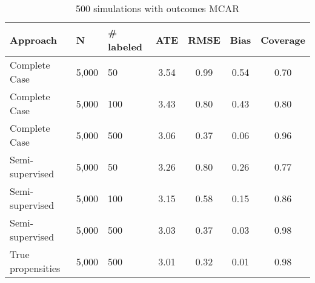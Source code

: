 \begin{table}[ht]
\centering
\begingroup\small
\begin{tabular}{lllcccc}
  \hline
Approach & N & \# labeled & ATE & RMSE & Bias & Coverage \\ 
  \hline
  Complete Case & 5,000 &  50 & 3.54 & 0.99 & 0.54 & 0.70 \\ 
  Complete Case & 5,000 & 100 & 3.43 & 0.80 & 0.43 & 0.80 \\ 
Complete Case & 5,000 & 500 & 3.06 & 0.37 & 0.06 & 0.96 \\ 
  Semi-supervised & 5,000 &  50 & 3.26 & 0.80 & 0.26 & 0.77 \\ 
  Semi-supervised & 5,000 & 100 & 3.15 & 0.58 & 0.15 & 0.86 \\ 
  Semi-supervised & 5,000 & 500 & 3.03 & 0.37 & 0.03 & 0.98 \\ 
  True propensities & 5,000 & 500 & 3.01 & 0.32 & 0.01 & 0.98 \\ 
   \hline
\end{tabular}
\endgroup
\caption{500 simulations with outcomes MCAR} 
\end{table}

